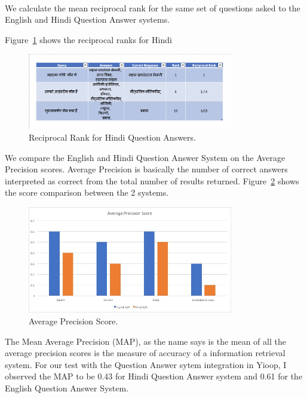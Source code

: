 \paragraph{}
We calculate the mean reciprocal rank for the same set of questions asked to the English and Hindi Question Answer systems.  

Figure~\ref{fig:score_table} shows the reciprocal ranks for Hindi

\begin{figure}[htb]
\centering
\includegraphics[width=0.8\textwidth]{images/score_table.jpg}
\caption{Reciprocal Rank for Hindi Question Answers.} 
\label{fig:score_table}
\end{figure}

We compare the English and Hindi Question Answer System on the  Average Precision scores. Average  Precision is basically the number of correct answers interpreted as correct from the total number of results returned. Figure~\ref{fig:AveragePrecisionScore} shows the score comparison between the 2 systems.

\begin{figure}[htb]
\centering
\includegraphics[width=0.8\textwidth]{images/AveragePrecisionScore.jpg}
\caption{Average Precision Score.} 
\label{fig:AveragePrecisionScore}
\end{figure}

The Mean Average Precision (MAP), as the name says is the mean of all the average precision scores is the measure of accuracy of a information retrieval system. For our test with the Question Answer sytem integration in Yioop,  I observed the MAP to be 0.43 for Hindi Question Answer system and 0.61 for the English Question Answer System.
